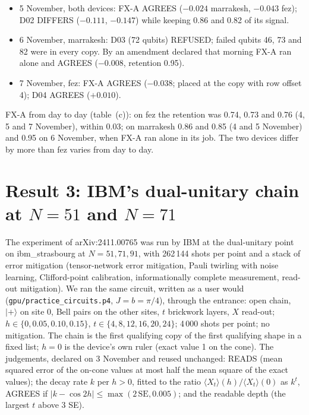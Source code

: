\documentclass[10pt,a4paper]{article}
\begin{document}
\begin{itemize}
\item 5 November, both devices: FX-A AGREES ($-0.024$ marrakesh, $-0.043$ fez); D02 DIFFERS ($-0.111$, $-0.147$)
while keeping 0.86 and 0.82 of its signal.
\item 6 November, marrakesh: D03 (72 qubits) REFUSED; failed qubits 46, 73 and 82 were in every copy. By an amendment
declared that morning FX-A ran alone and AGREES ($-0.008$, retention 0.95).
\item 7 November, fez: FX-A AGREES ($-0.038$; placed at the copy with row offset 4); D04 AGREES ($+0.010$).
\end{itemize}

FX-A from day to day (table~(c)): on fez the retention was 0.74, 0.73 and 0.76 (4, 5 and 7 November), within 0.03;
on marrakesh 0.86 and 0.85 (4 and 5 November) and 0.95 on 6 November, when FX-A ran alone in its job. The two devices
differ by more than fez varies from day to day.

\section{Result 3: IBM's dual-unitary chain at $N = 51$ and $N = 71$}\label{sec:du}
The experiment of arXiv:2411.00765 was run by IBM at the dual-unitary point on ibm\_strasbourg at $N = 51, 71, 91$,
with 262\,144 shots per point and a stack of error mitigation (tensor-network error mitigation, Pauli twirling with
noise learning, Clifford-point calibration, informationally complete measurement, read-out mitigation). We ran the
same circuit, written as a user would (\texttt{gpu/practice\_circuits.p4}, $J = b = \pi/4$), through the entrance:
open chain, $|{+}\rangle$ on site 0, Bell pairs on the other sites, $t$ brickwork layers, $X$ read-out;
$h \in \{0, 0.05, 0.10, 0.15\}$, $t \in \{4, 8, 12, 16, 20, 24\}$; 4\,000 shots per point; no mitigation. The chain
is the first qualifying copy of the first qualifying shape in a fixed list; $h = 0$ is the device's own ruler (exact
value 1 on the cone). The judgements, declared on 3 November and reused unchanged: READS (mean squared error of the
on-cone values at most half the mean square of the exact values); the decay rate $k$ per $h > 0$, fitted to the ratio
$\langle X_t\rangle(h) / \langle X_t\rangle(0)$ as $k^t$, AGREES if $|k - \cos 2h| \le \max(2\,\mathrm{SE}, 0.005)$;
and the readable depth (the largest $t$ above 3 SE).
\end{document}
